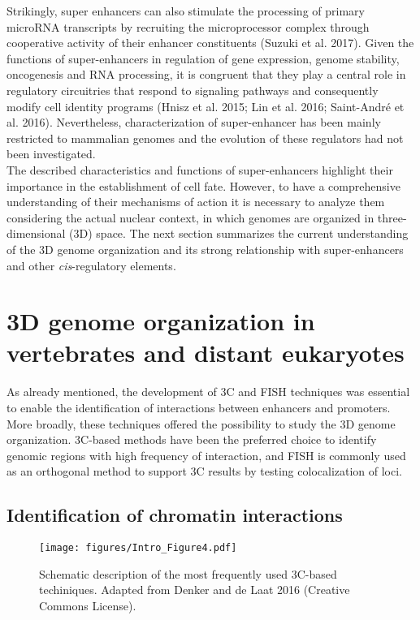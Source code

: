 Strikingly, super enhancers can also stimulate the processing of primary microRNA transcripts by recruiting the microprocessor complex through cooperative activity of their enhancer constituents (Suzuki et al. 2017). Given the functions of super-enhancers in regulation of gene expression, genome stability, oncogenesis and RNA processing, it is congruent that they play a central role in regulatory circuitries that respond to signaling pathways and consequently modify cell identity programs (Hnisz et al. 2015; Lin et al. 2016; Saint-André et al. 2016). Nevertheless, characterization of super-enhancer has been mainly restricted to mammalian genomes and the evolution of these regulators had not been investigated.\\

The described characteristics and functions of super-enhancers highlight their importance in the establishment of cell fate. However, to have a comprehensive understanding of their mechanisms of action it is necessary to analyze them considering the actual nuclear context, in which genomes are organized in three-dimensional (3D) space. The next section summarizes the current understanding of the 3D genome organization and its strong relationship with super-enhancers and other \textit{cis}-regulatory elements.\\

	\section{3D genome organization in vertebrates and distant eukaryotes}

As already mentioned, the development of 3C and FISH techniques was essential to enable the identification of interactions between enhancers and promoters. More broadly, these techniques offered the possibility to study the 3D genome organization. 3C-based methods have been the preferred choice to identify genomic regions with high frequency of interaction, and FISH is commonly used as an orthogonal method to support 3C results by testing colocalization of loci.\\

		\subsection{Identification of chromatin interactions}


		\begin{figure}[h!]
			\centering
			\texttt{[image: figures/Intro\_Figure4.pdf]}
  			\caption[intro4]{Schematic description of the most frequently used 3C-based techiniques. Adapted from Denker and de Laat 2016 (Creative Commons License).}
			\label{intro4}
		\end{figure}


